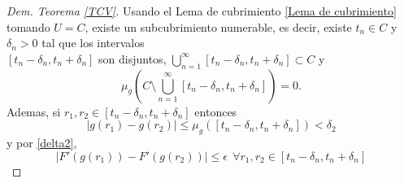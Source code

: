 \begin{proof}[Dem. Teorema \eqref{TCV}]
	Usando el Lema de cubrimiento \ref{Lema de  cubrimiento} tomando $U=C$, existe un subcubrimiento numerable, es decir, existe $t_n\in C$ y $\delta_{n}>0$ tal que los intervalos\\ $[t_n-\delta_n, t_n+\delta_n]$ son disjuntos, $\displaystyle\bigcup_{n=1}^{\infty}[t_n-\delta_n, t_n+\delta_n]\subset C$ y \begin{equation}\label{eq:cubrimiento}
	    \displaystyle\mu_{g}\left( C\setminus\bigcup_{n=1}^{\infty}[t_n-\delta_n, t_n+\delta_n]\right) =0.\end{equation}
Ademas, si $r_1,r_2\in[t_n-\delta_n, t_n+\delta_n]$ entonces 
	\begin{equation}
	|g(r_1)-g(r_2)|\leq \mu_{g}\left( [t_n-\delta_n, t_n+\delta_n]\right)<\delta_2
	\label{eq:cota de g(C)}
\end{equation}
	y por \ref{delta2},
	\begin{equation}\label{eq:1}
	|F'(g(r_1))-F'(g(r_2))|\leq \epsilon\ \ \forall r_1,r_2\in [t_n-\delta_n, t_n+\delta_n]
\end{equation}
	

\end{proof}
